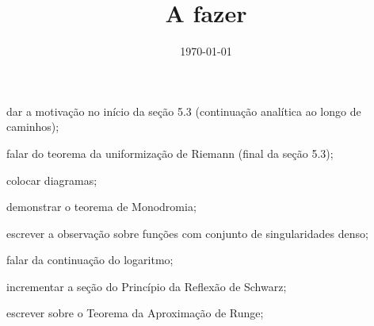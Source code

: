\documentclass[12pt,a4paper]{article}
\title{A fazer}
\author{}
\date{\today}
\newcommand{\cmark}{\ding{51}}%
\newcommand{\done}{\rlap{$\square$}{\raisebox{2pt}{\large\hspace{1pt}\cmark}}%
\hspace{-2.5pt}}
\begin{document}
\maketitle

\begin{todolist}
    \item dar a motivação no início da seção 5.3 (continuação analítica ao longo
    de caminhos);
    \item falar do teorema da uniformização de Riemann (final da seção 5.3); 
    \item colocar diagramas;
    \item[\done] demonstrar o teorema de Monodromia;
    \item[\done] escrever a observação sobre funções com conjunto de singularidades denso;
    \item[\done] falar da continuação do logaritmo;
    \item incrementar a seção do Princípio da Reflexão de Schwarz;
    \item escrever sobre o Teorema da Aproximação de Runge;

\end{todolist}
\end{document}
